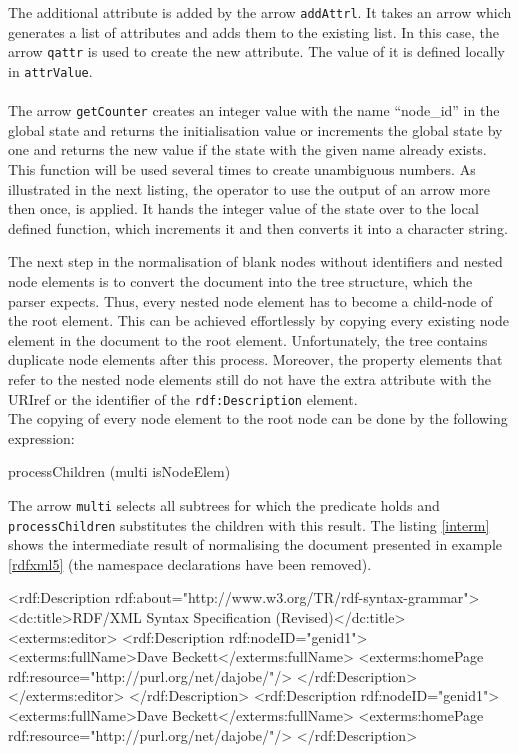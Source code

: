\documentclass[11pt,a4paper,headsepline, bibtotoc]{scrreprt}
\begin{document}
The additional attribute is added by the arrow \texttt{addAttrl}. It takes an arrow which generates a list of attributes and adds them to the existing list. In this case, the arrow \texttt{qattr} is used to create the new attribute. The value of it is defined locally in \texttt{attrValue}.\\
\\
The arrow \texttt{getCounter} creates an integer value with the name ``node\_id'' in the global state and returns the initialisation value or increments the global state by one and returns the new value if the state with the given name already exists. This function will be used several times to create unambiguous numbers. As illustrated in the next listing, the operator to use the output of an arrow more then once, is applied. It hands the integer value of the state over to the local defined function, which increments it and then converts it into a character string. 
The next step in the normalisation of blank nodes without identifiers and nested node elements is to convert the document into the tree structure, which the parser expects. Thus, every nested node element has to become a child-node of the root element. This can be achieved effortlessly by copying every existing node element in the document to the root element. Unfortunately, the tree contains duplicate node elements after this process. Moreover, the property elements that refer to the nested node elements still do not have the extra attribute with the URIref or the identifier of the \texttt{rdf:Description} element.\\
The copying of every node element to the root node can be done by the following expression:
\begin{code}
processChildren (multi isNodeElem)
\end{code}
The arrow \texttt{multi} selects all subtrees for which the predicate holds and \texttt{processChildren} substitutes the children with this result. The listing \ref{interm} shows the intermediate result of normalising the document presented in example \ref{rdfxml5} (the namespace declarations have been removed).
\begin{xmlnb}[caption={Intermediate Result of Normalisation},label={interm}]
<rdf:Description rdf:about="http://www.w3.org/TR/rdf-syntax-grammar">
  <dc:title>RDF/XML Syntax Specification (Revised)</dc:title>
  <exterms:editor>
    <rdf:Description rdf:nodeID="genid1">
      <exterms:fullName>Dave Beckett</exterms:fullName>
      <exterms:homePage rdf:resource="http://purl.org/net/dajobe/"/>
    </rdf:Description>
  </exterms:editor>
</rdf:Description>
<rdf:Description rdf:nodeID="genid1">
  <exterms:fullName>Dave Beckett</exterms:fullName>
  <exterms:homePage rdf:resource="http://purl.org/net/dajobe/"/>
</rdf:Description>
\end{xmlnb}
\end{document}
